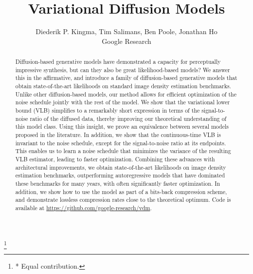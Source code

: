 \documentclass{article}
\title{Variational Diffusion Models}
\author{Diederik P. Kingma, Tim Salimans, Ben Poole, Jonathan Ho\\
  Google Research\\
}
\begin{document}
{\let\thefootnote\relax\footnote{* Equal contribution.}}
\maketitle

\begin{abstract}
Diffusion-based generative models have demonstrated a capacity for perceptually impressive synthesis, but can they also be great likelihood-based models? We answer this in the affirmative, and introduce a family of diffusion-based generative models that obtain state-of-the-art likelihoods on standard image density estimation benchmarks. Unlike other diffusion-based models, our method allows for efficient optimization of the noise schedule jointly with the rest of the model. We show that the variational lower bound (VLB) simplifies to a remarkably short expression in terms of the signal-to-noise ratio of the diffused data, thereby improving our theoretical understanding of this model class. Using this insight, we prove an equivalence between several models proposed in the literature. In addition, we show that the continuous-time VLB is invariant to the noise schedule, except for the signal-to-noise ratio at its endpoints. This enables us to learn a noise schedule that minimizes the variance of the resulting VLB estimator, leading to faster optimization. Combining these advances with architectural improvements, we obtain state-of-the-art likelihoods on image density estimation benchmarks, outperforming autoregressive models that have dominated these benchmarks for many years, with often significantly faster optimization. In addition, we show how to use the model as part of a bits-back compression scheme, and demonstrate lossless compression rates close to the theoretical optimum. Code is available at \url{https://github.com/google-research/vdm}.














\end{abstract}
\end{document}
